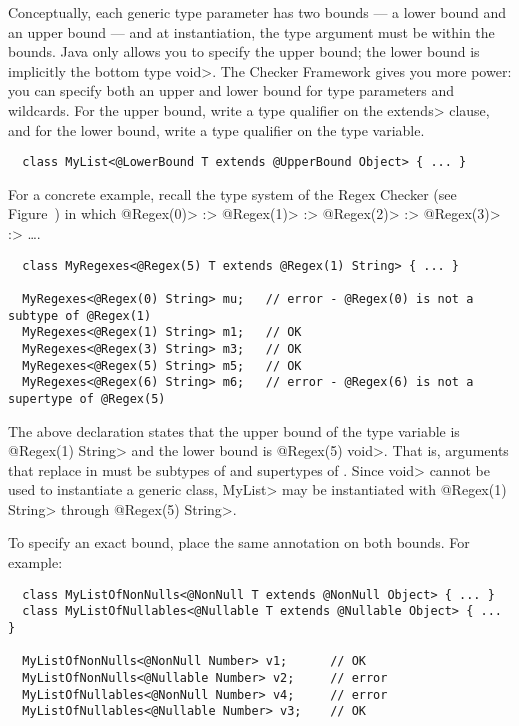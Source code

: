 Conceptually, each generic type parameter has two bounds --- a lower bound
and an upper bound --- and at instantiation, the type argument must be
within the bounds.  Java only allows you to specify the upper bound; the
lower bound is implicitly the bottom type \<void>.  The Checker Framework
gives you more power:  you can specify both an upper and lower bound for
type parameters and wildcards.  For the upper bound, write a type qualifier
on the \<extends> clause, and for the lower bound, write a type qualifier
on the type variable.

\begin{Verbatim}
  class MyList<@LowerBound T extends @UpperBound Object> { ... }
\end{Verbatim}

For a concrete example, recall the type system of the Regex Checker (see
Figure~) in which
 \<@Regex(0)> :>
 \<@Regex(1)> :>
 \<@Regex(2)> :>
 \<@Regex(3)> :> \ldots.

\begin{Verbatim}
  class MyRegexes<@Regex(5) T extends @Regex(1) String> { ... }

  MyRegexes<@Regex(0) String> mu;   // error - @Regex(0) is not a subtype of @Regex(1)
  MyRegexes<@Regex(1) String> m1;   // OK
  MyRegexes<@Regex(3) String> m3;   // OK
  MyRegexes<@Regex(5) String> m5;   // OK
  MyRegexes<@Regex(6) String> m6;   // error - @Regex(6) is not a supertype of @Regex(5)
\end{Verbatim}

The above declaration states that the upper bound of the type variable
is \<@Regex(1) String> and the lower bound is \<@Regex(5) void>.  That is,
arguments that replace  in  must be subtypes of
 and supertypes of .
Since \<void> cannot be used to instantiate a generic class, \<MyList> may
be instantiated with \<@Regex(1) String> through \<@Regex(5) String>.


To specify an exact bound, place the same annotation on both bounds.  For example:

\begin{Verbatim}
  class MyListOfNonNulls<@NonNull T extends @NonNull Object> { ... }
  class MyListOfNullables<@Nullable T extends @Nullable Object> { ... }

  MyListOfNonNulls<@NonNull Number> v1;      // OK
  MyListOfNonNulls<@Nullable Number> v2;     // error
  MyListOfNullables<@NonNull Number> v4;     // error
  MyListOfNullables<@Nullable Number> v3;    // OK
\end{Verbatim}

